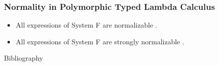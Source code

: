 \documentclass[10pt, compress]{beamer}
\begin{document}
\begin{frame}[fragile]
    \frametitle{Normality in Polymorphic Typed Lambda Calculus}
  
    \begin{itemize}
        \item All expressions of System F are normalizable \cite{girard1972phd}.
        \item All expressions of System F are strongly normalizable \cite{PRAWITZ1971235}.
    \end{itemize}
\end{frame}


\begin{frame}{Bibliography}


\end{frame}

\end{document}
